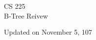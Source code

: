 \documentclass[11pt, letterpaper]{article}
\theoremstyle{definition}
\theoremstyle{theorem}
\begin{document}
  \begin{titlepage}
    {\LARGE CS 225} \\ 
    {\large B-Tree Reivew}
    \begin{multicols}{3}
      \tableofcontents
    \end{multicols}
    \vfill 
    Updated on November 5, 107
  \end{titlepage}
  
  \begin{multicols}{3}
    
    
    
    
  \end{multicols}
\end{document}
